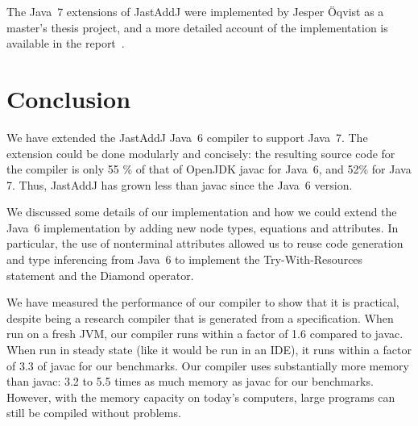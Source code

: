 {The Java~7 extensions of JastAddJ were implemented by Jesper {\"O}qvist as a master's thesis project, and a more detailed account of the implementation is available in the report~\cite{Oqvist2012MSc}.







\section{Conclusion}
\label{java7:sec:conclusions}

We have extended the JastAddJ Java~6 compiler to support Java~7. The extension
could be done modularly and concisely: the resulting source code for the
compiler is only 55 \% of that of OpenJDK javac for Java~6, and 52\% for Java
7. Thus, JastAddJ has grown less than javac since the Java~6 version.

We discussed some details of our implementation and how we could
extend the Java~6 implementation by adding new node types, equations and
attributes. In particular, the use of nonterminal attributes allowed us to
reuse code generation and type inferencing from Java~6 to implement the
Try-With-Resources statement and the Diamond operator.

We have measured the performance of our compiler to show that it is practical,
despite being a research compiler that is generated from a specification. When
run on a fresh JVM, our compiler runs within a factor of 1.6 compared to javac.
When run in steady state (like it would be run in an IDE), it runs within a
factor of 3.3 of javac for our benchmarks. Our compiler uses substantially
more memory than javac: 3.2 to 5.5 times as much memory as javac for our
benchmarks. However, with the memory capacity on today's computers, large
programs can still be compiled without problems.


}
